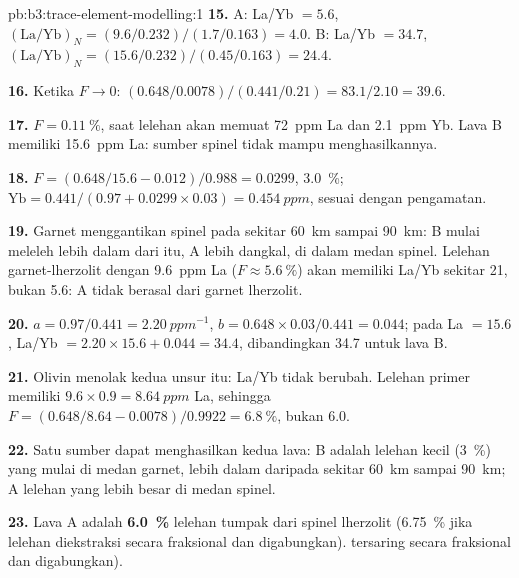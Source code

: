 \begin{solution}{pb:b3:trace-element-modelling:1}
\textbf{15.} A: La/Yb $= 5.6$, $(\mathrm{La}/\mathrm{Yb})_N =
(9.6/0.232)/(1.7/0.163) = 4.0$. B: La/Yb $= 34.7$, $(\mathrm{La}/\mathrm{Yb})_N
= (15.6/0.232)/(0.45/0.163) = 24.4$.

\textbf{16.} Ketika $F \to 0$: $(0.648/0.0078)/(0.441/0.21) = 83.1/2.10 = 39.6$.

\textbf{17.} $F = \qty{0.11}{\percent}$, saat lelehan akan memuat
\qty{72}{ppm} La dan \qty{2.1}{ppm} Yb. Lava B memiliki \qty{15.6}{ppm} La: sumber
spinel tidak mampu menghasilkannya.

\textbf{18.} $F = (0.648/15.6 - 0.012)/0.988 = 0.0299$, \qty{3.0}{\percent};
$\mathrm{Yb} = 0.441/(0.97 + 0.0299\times0.03) = \qty{0.454}{ppm}$, sesuai
dengan pengamatan.

\textbf{19.} Garnet menggantikan spinel pada sekitar \qty{60}{km} sampai \qty{90}{km}: B mulai
meleleh lebih dalam dari itu, A lebih dangkal, di dalam medan spinel. Lelehan
garnet-lherzolit dengan \qty{9.6}{ppm} La ($F \approx \qty{5.6}{\percent}$) akan memiliki La/Yb
sekitar 21, bukan 5.6: A tidak berasal dari garnet lherzolit.

\textbf{20.} $a = 0.97/0.441 = \qty{2.20}{ppm^{-1}}$, $b = 0.648\times0.03/0.441
= 0.044$; pada La $= 15.6$, La/Yb $= 2.20\times15.6 + 0.044 = 34.4$, dibandingkan
34.7 untuk lava B.

\textbf{21.} Olivin menolak kedua unsur itu: La/Yb tidak berubah. Lelehan primer
memiliki $9.6\times0.9 = \qty{8.64}{ppm}$ La, sehingga $F = (0.648/8.64 -
0.0078)/0.9922 = \qty{6.8}{\percent}$, bukan 6.0.

\textbf{22.} Satu sumber dapat menghasilkan kedua lava: B adalah lelehan kecil
(\qty{3}{\percent}) yang mulai di medan garnet, lebih dalam daripada sekitar \qty{60}{km} sampai
\qty{90}{km}; A lelehan yang lebih besar di medan spinel.

\textbf{23.} Lava A adalah \textbf{\qty[text-series-to-math=true]{6.0}{\percent}}
lelehan tumpak dari spinel lherzolit (\qty{6.75}{\percent} jika lelehan diekstraksi secara fraksional dan digabungkan).
tersaring secara fraksional dan digabungkan).
\end{solution}
